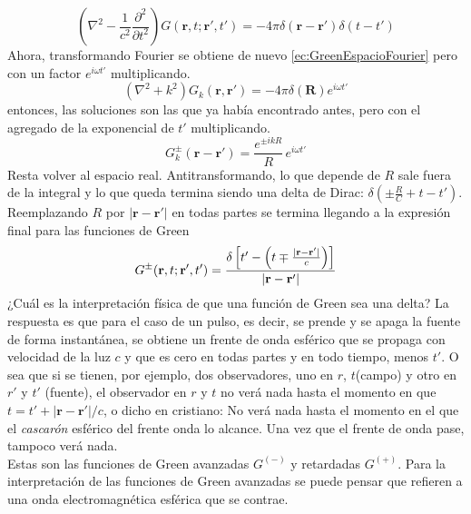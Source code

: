 \begin{equation*}
    \left(
        \nabla^{2} - \frac{1}{c^{2}}\frac{\partial ^{2}}{\partial t^{2}}
    \right)
    G(\textbf{r} , t; \textbf{r}', t') = 
    -4\pi\delta(\textbf{r}-\textbf{r}')\delta(t - t')
\end{equation*}
Ahora, transformando Fourier se obtiene de nuevo \eqref{ec:GreenEspacioFourier} pero con un factor $e^{i\omega t'}$ multiplicando.
\begin{equation*}
    \left(
        \nabla^{2} + k^{2}
    \right)
    G_{k}(\textbf{r}, \textbf{r}')
    = -4\pi\delta(\textbf{R})e^{i\omega t'}
\end{equation*}
entonces, las soluciones son las que ya había encontrado antes, pero con el agregado de la exponencial de $t'$ multiplicando.
\begin{equation*}
    G_{k}^{\pm}(\textbf{r}-\textbf{r}') = 
    \frac{e^{\pm ikR}}{R}\,e^{i\omega t'}
\end{equation*}
Resta volver al espacio real. Antitransformando, lo que depende de $R$ sale fuera de la integral y lo que queda termina siendo una delta de Dirac: $\delta\left(\pm \frac{R}{C}  +t - t'\right)$. Reemplazando $R$ por $|\textbf{r}-\textbf{r}'|$ en todas partes se termina llegando a la expresión final para las funciones de Green
\begin{equation}
   G^{\pm}(\textbf{r},t;\textbf{r}',t') =
   \frac%
    {%
        \delta
        \left[
            t' - 
            \left(
                t \mp \frac{|\textbf{r}-\textbf{r}'|}{c}
            \right)
        \right]
    }%
    {
        |\textbf{r}-\textbf{r}'|
    }
        \label{ec:FuncionGreenRetAva}
\end{equation}
¿Cuál es la interpretación física de que una función de Green sea una delta? La respuesta es que para el caso de un pulso, es decir, se prende y se apaga la fuente de forma instantánea, se obtiene un frente de onda esférico que se propaga con velocidad de la luz $c$ y que es cero en todas partes y en todo tiempo, menos $t'$. O sea que si se tienen, por ejemplo, dos observadores, uno en $r$, $t$(campo) y otro en $r'$ y $t'$ (fuente), el observador en $r$ y $t$ no verá nada hasta el momento en que $t = t' + |\textbf{r}-\textbf{r}'|/c$, o dicho en cristiano: No verá nada hasta el momento en el que el \textit{cascarón} esférico del frente onda lo alcance. Una vez que el frente de onda pase, tampoco verá nada.\\
\indent Estas son las funciones de Green avanzadas $G^{(-)}$ y retardadas $G^{(+)}$. Para la interpretación de las funciones de Green avanzadas se puede pensar que refieren a una onda electromagnética esférica que se contrae.\\
